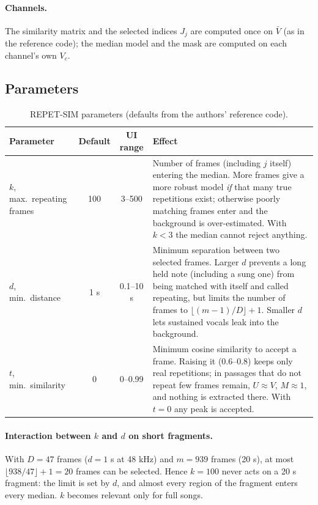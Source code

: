 \documentclass[11pt,a4paper]{article}
\begin{document}
\paragraph{Channels.} The similarity matrix and the selected indices $J_j$
are computed once on $\bar V$ (as in the reference code); the median
model and the mask are computed on each channel's own $V_c$.

\subsection{Parameters}
\begin{table}[htbp]
\centering
\caption{REPET-SIM parameters (defaults from the authors' reference code).}
\label{tab:repetsim}
\begin{tabularx}{\linewidth}{@{}p{2.6cm}ccL@{}}
\toprule
Parameter & Default & UI range & Effect \\
\midrule
$k$, max.\ repeating frames & 100 & 3--500 & Number of frames (including $j$ itself) entering the median. More frames give a more robust model \emph{if} that many true repetitions exist; otherwise poorly matching frames enter and the background is over-estimated. With $k<3$ the median cannot reject anything. \\
$d$, min.\ distance & 1 s & 0.1--10 s & Minimum separation between two selected frames. Larger $d$ prevents a long held note (including a sung one) from being matched with itself and called repeating, but limits the number of frames to $\lfloor (m-1)/D\rfloor+1$. Smaller $d$ lets sustained vocals leak into the background. \\
$t$, min.\ similarity & 0 & 0--0.99 & Minimum cosine similarity to accept a frame. Raising it (0.6--0.8) keeps only real repetitions; in passages that do not repeat few frames remain, $U\approx V$, $M\approx1$, and nothing is extracted there. With $t=0$ any peak is accepted. \\
\bottomrule
\end{tabularx}
\end{table}

\paragraph{Interaction between $k$ and $d$ on short fragments.} With
$D=47$ frames ($d=1$ s at 48 kHz) and $m=939$ frames (20 s), at most
$\lfloor 938/47\rfloor+1=20$ frames can be selected. Hence $k=100$ never
acts on a 20 s fragment: the limit is set by $d$, and almost every region
of the fragment enters every median. $k$ becomes relevant only for full
songs.
\end{document}
